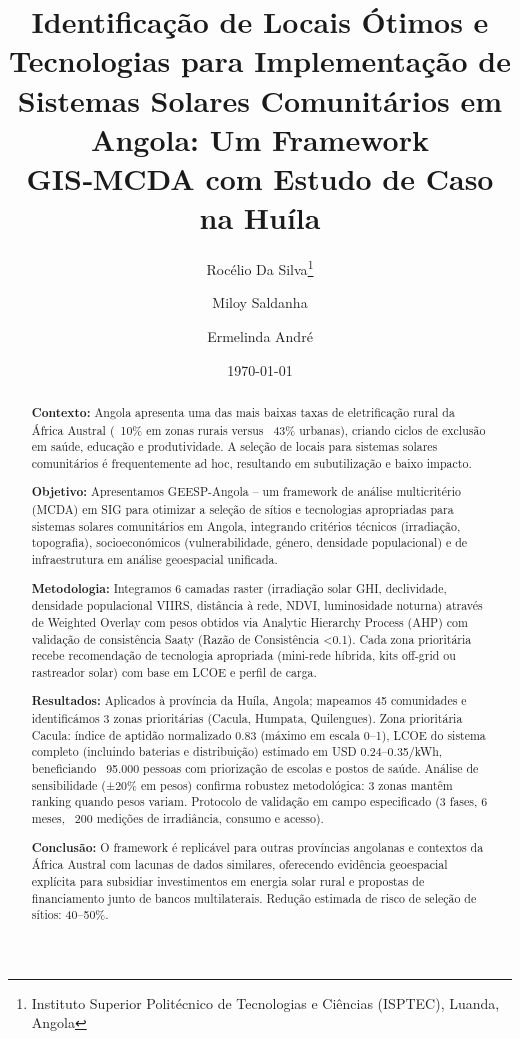 \documentclass[12pt, a4paper]{article}
\begin{document}
\title{Identificação de Locais Ótimos e Tecnologias para Implementação de Sistemas Solares Comunitários em Angola: Um Framework GIS‑MCDA com Estudo de Caso na Huíla}
\author{Rocélio Da Silva\thanks{Instituto Superior Politécnico de Tecnologias e Ciências (ISPTEC), Luanda, Angola} \and Miloy Saldanha \and Ermelinda André}
\date{\today}
\maketitle

\begin{abstract}
\textbf{Contexto:} Angola apresenta uma das mais baixas taxas de eletrificação rural da África Austral (~10\% em zonas rurais versus ~43\% urbanas), criando ciclos de exclusão em saúde, educação e produtividade. A seleção de locais para sistemas solares comunitários é frequentemente ad hoc, resultando em subutilização e baixo impacto.

\textbf{Objetivo:} Apresentamos GEESP-Angola – um framework de análise multicritério (MCDA) em SIG para otimizar a seleção de sítios e tecnologias apropriadas para sistemas solares comunitários em Angola, integrando critérios técnicos (irradiação, topografia), socioeconómicos (vulnerabilidade, género, densidade populacional) e de infraestrutura em análise geoespacial unificada.

\textbf{Metodologia:} Integramos 6 camadas raster (irradiação solar GHI, declividade, densidade populacional VIIRS, distância à rede, NDVI, luminosidade noturna) através de Weighted Overlay com pesos obtidos via Analytic Hierarchy Process (AHP) com validação de consistência Saaty (Razão de Consistência <0.1). Cada zona prioritária recebe recomendação de tecnologia apropriada (mini-rede híbrida, kits off-grid ou rastreador solar) com base em LCOE e perfil de carga.

\textbf{Resultados:} Aplicados à província da Huíla, Angola; mapeamos 45 comunidades e identificámos 3 zonas prioritárias (Cacula, Humpata, Quilengues). Zona prioritária Cacula: índice de aptidão normalizado 0.83 (máximo em escala 0–1), LCOE do sistema completo (incluindo baterias e distribuição) estimado em USD 0.24–0.35/kWh, beneficiando ~95.000 pessoas com priorização de escolas e postos de saúde. Análise de sensibilidade (±20\% em pesos) confirma robustez metodológica: 3 zonas mantêm ranking quando pesos variam. Protocolo de validação em campo especificado (3 fases, 6 meses, ~200 medições de irradiância, consumo e acesso).

\textbf{Conclusão:} O framework é replicável para outras províncias angolanas e contextos da África Austral com lacunas de dados similares, oferecendo evidência geoespacial explícita para subsidiar investimentos em energia solar rural e propostas de financiamento junto de bancos multilaterais. Redução estimada de risco de seleção de sítios: 40–50\%.
\end{abstract}
\vspace{6pt}
\end{document}
